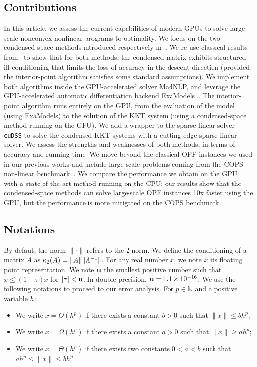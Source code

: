 \subsection{Contributions}
In this article, we assess the current capabilities of modern GPUs
to solve large-scale nonconvex nonlinear programs to optimality.
We focus on the two condensed-space methods
introduced respectively in~\cite{regev2023hykkt,shin2023accelerating}.
We re-use classical results from~\cite{wright1998ill} to show
that for both methods, the condensed matrix exhibits
structured ill-conditioning that limits the loss of accuracy in
the descent direction (provided the interior-point algorithm satisfies
some standard assumptions).
We implement both algorithms inside the GPU-accelerated solver MadNLP,
and leverage the GPU-accelerated automatic differentiation
backend ExaModels~\cite{shin2023accelerating}.
The interior-point algorithm runs entirely on the GPU, from
the evaluation of the model (using ExaModels) to the solution of
the KKT system (using a condensed-space method running on the GPU).
We add a wrapper to the sparse linear solver {\tt cuDSS} to solve
the condensed KKT systems with a cutting-edge sparse linear solver.
We assess the strengths
and weaknesses of both methods, in terms of accuracy and running time.
We move beyond the classical OPF instances we used in our previous works
and include large-scale problems coming from the COPS
non-linear benchmark~\cite{dolan2004benchmarking}.
We compare the performance we obtain on the GPU with a state-of-the-art
method running on the CPU: our results show that the condensed-space
methods can solve large-scale OPF instances 10x faster using the GPU,
but the performance is more mitigated on the COPS benchmark.

\subsection{Notations}
By defaut, the norm $\|\cdot\|$ refers to the 2-norm.
We define the conditioning of a matrix $A$ as
$\kappa_2(A) = \| A \| \|A^{-1} \|$.
For any real number $x$, we note $\widehat{x}$ its floating
point representation.
We note $\mathbf{u}$ the smallest positive number such that
$\widehat{x} \leq (1 + \tau) x$ for $|\tau| < \mathbf{u}$.
In double precision, $\mathbf{u} = 1.1 \times 10^{-16}$.
We use the following notations to proceed to our error analysis.
For $p \in \mathbb{N}$ and a positive variable $h$:
\begin{itemize}
  \item We write $x = O(h^p)$ if there exists a constant $b > 0$
    such that $\| x \| \leq b h^p$;
  \item We write $x = \Omega(h^p)$ if there exists a constant $a > 0$
    such that $\| x \| \geq a h^p$;
  \item We write $x = \Theta(h^p)$ if there exists two constants $0 < a < b$
    such that $a h^p \leq \| x \| \leq b h^p$.
\end{itemize}


